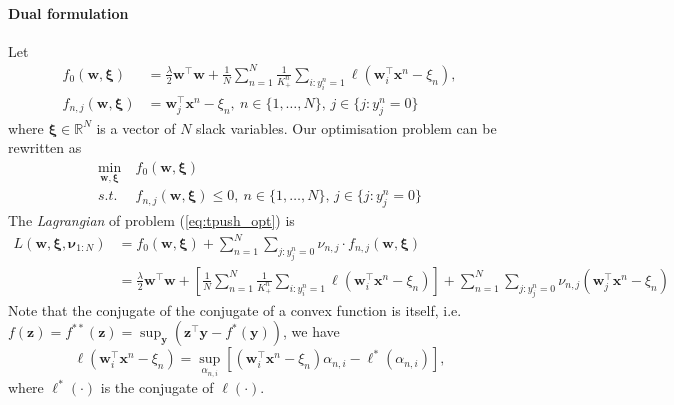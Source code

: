 \documentclass[9pt]{extarticle}
\newcommand{\x}{\mathbf{x}}
\newcommand{\y}{\mathbf{y}}
\newcommand{\z}{\mathbf{z}}
\newcommand{\1}{\mathbf{1}}
\newcommand{\w}{\mathbf{w}}
\newcommand{\R}{\mathbb{R}}
\newcommand{\nubm}{\bm{\nu}}
\newcommand{\xibm}{\bm{\xi}}
\newcommand{\ie}{i.e.\ }
\begin{document}
\paragraph{Dual formulation}
Let
\begin{align*}
f_0(\w, \xibm)     &= \frac{\lambda}{2} \w^\top \w + \frac{1}{N} \sum_{n=1}^N \frac{1}{K_+^n} \sum_{i:y_i^n=1} \ell \left( \w_i^\top \x^n - \xi_n \right), \\
f_{n,j}(\w, \xibm) &= \w_j^\top \x^n - \xi_n, \ n \in \{1,\dots,N\}, \, j \in \{j: y_j^n = 0\}
\end{align*}
where $\xibm \in \R^{N}$ is a vector of $N$ slack variables.
%
Our optimisation problem can be rewritten as
\begin{equation}
\label{eq:tpush_opt}
\begin{aligned}
\min_{\w, \xibm} \ & f_0(\w, \xibm) \\
s.t.             \ & f_{n,j}(\w, \xibm) \le 0, \ n \in \{1,\dots,N\}, \, j \in \{j: y_j^n = 0\}
\end{aligned}
\end{equation}
%
The \emph{Lagrangian} of problem (\ref{eq:tpush_opt}) is
\begin{equation}
\label{eq:tpush_lg}
\begin{aligned}
L(\w, \xibm, \nubm_{1:N}) 
&= f_0(\w, \xibm) + \sum_{n=1}^N \sum_{j:y_j^n=0} \nu_{n,j} \cdot f_{n,j}(\w, \xibm) \\
&= \frac{\lambda}{2} \w^\top \w + \left[ \frac{1}{N} \sum_{n=1}^N \frac{1}{K_+^n} \sum_{i:y_i^n=1} \ell \left( \w_i^\top \x^n - \xi_n \right) \right] +
   \sum_{n=1}^N \sum_{j:y_j^n=0} \nu_{n,j} \left( \w_j^\top \x^n - \xi_n \right)
\end{aligned}
\end{equation}
%
Note that the conjugate of the conjugate of a convex function is itself, \ie $f(\z) = f^{**}(\z) = \sup_{\y} \left( \z^\top \y - f^*(\y) \right)$, we have
\begin{equation}
\label{eq:conjugate}
\ell( \w_i^\top \x^n - \xi_n) = \sup_{\alpha_{n,i}} \left[ \left( \w_i^\top \x^n - \xi_n \right) \alpha_{n,i} - \ell^*(\alpha_{n,i}) \right],
\end{equation}
where $\ell^*(\cdot)$ is the conjugate of $\ell(\cdot)$.
\end{document}
